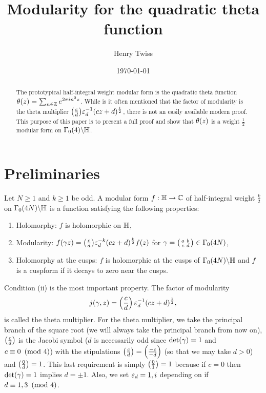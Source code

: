\documentclass[12pt,reqno,oneside]{amsart}
\title{Modularity for the quadratic theta function}
\author{Henry Twiss}
\date{\today}
\begin{document}
\begin{abstract}
    The prototypical half-integral weight modular form is the quadratic theta function $\theta(z) = \sum_{n \in \mathbb{Z}}e^{2\pi in^{2}z}$. While is it often mentioned that the factor of modularity is the theta multiplier $\textstyle{\left(\frac{c}{d}\right)}\varepsilon_{d}^{-1}(cz+d)^{\frac{1}{2}}$, there is not an easily available modern proof. This purpose of this paper is to present a full proof and show that $\theta(z)$ is a weight $\frac{1}{2}$ modular form on $\Gamma_{0}(4)\backslash\mathbb{H}$.
\end{abstract}

\maketitle

\section{Preliminaries}
    Let $N \ge 1$ and $k \ge 1$ be odd. A modular form $f:\mathbb{H} \to \mathbb{C}$ of half-integral weight $\frac{k}{2}$ on $\Gamma_{0}(4N)\backslash\mathbb{H}$ is a function satisfying the following properties:
    \begin{enumerate}[label=(\roman*)]
        \item Holomorphy: $f$ is holomorphic on $\mathbb{H}$,
        \item Modularity: $f(\gamma z) = \textstyle{\left(\frac{c}{d}\right)}\varepsilon_{d}^{-k}(cz+d)^{\frac{k}{2}}f(z)$ for $\gamma = \begin{psmallmatrix} a & b \\ c & d \end{psmallmatrix} \in \Gamma_{0}(4N)$,
        \item Holomorphy at the cusps: $f$ is holomorphic at the cusps of $\Gamma_{0}(4N)\backslash\mathbb{H}$ and $f$ is a cuspform if it decays to zero near the cusps.
    \end{enumerate}
    Condition (ii) is the most important property. The factor of modularity
    \[
        j(\gamma,z) = \left(\frac{c}{d}\right)\varepsilon_{d}^{-1}(cz+d)^{\frac{1}{2}},
    \]
    is called the theta multiplier. For the theta multiplier, we take the principal branch of the square root (we will always take the principal branch from now on), $\left(\frac{c}{d}\right)$ is the Jacobi symbol ($d$ is necessarily odd since $\det(\gamma) = 1$ and $c \equiv 0 \ \left(\text{mod }4\right)$) with the stipulations $\left(\frac{c}{d}\right) = \left(\frac{-c}{-d}\right)$ (so that we may take $d > 0$) and $\left(\frac{0}{d}\right) = 1$. This last requirement is simply $\left(\frac{0}{1}\right) = 1$ because if $c = 0$ then $\det(\gamma) = 1$ implies $d = \pm 1$. Also, we set $\varepsilon_{d} = 1,i$ depending on if $d \equiv 1,3 \ \left(\text{mod }4\right)$.
    
\end{document}
